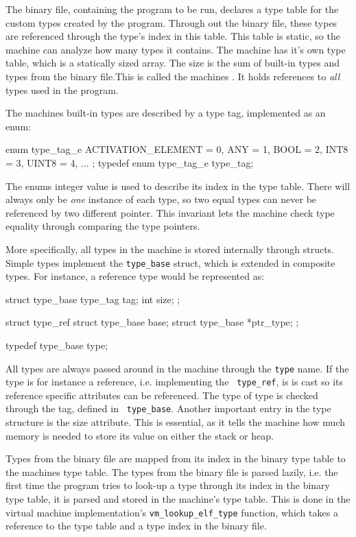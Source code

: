 The binary file, containing the program to be run, declares a type table for the
custom types created by the program. Through out the binary file, these types
are referenced through the type's index in this table. This table is static, so
the machine can analyze how many types it contains. The machine has it's own
type table, which is a statically sized array. The size is the sum of built-in
types and types from the binary file.This is called the machines . It holds references to {\it all} types used in the program.

The machines built-in types are described by a type tag, implemented as an enum:
\begin{ccode}
enum type_tag_e {
    ACTIVATION_ELEMENT = 0,
    ANY                = 1,
    BOOL               = 2,
    INT8               = 3,
    UINT8              = 4,
    ...
};
typedef enum type_tag_e type_tag;
\end{ccode}
The enums integer value is used to describe its index in the type table. There
will always only be {\it one} instance of each type, so two equal types can
never be referenced by two different pointer. This invariant lets the machine
check type equality through comparing the type pointers.

More specifically, all types in the machine is stored internally through
structs. Simple types implement the {\tt type\_base} struct, which is extended
in composite types. For instance, a reference type would be represented as:
\begin{ccode}
struct type_base {
    type_tag tag;
    int size;
};

struct type_ref {
    struct type_base base;
    struct type_base *ptr_type;
};

typedef type_base type;
\end{ccode}

All types are always passed around in the machine through the {\tt type}
name. If the type is for instance a reference, i.e. implementing the {\tt
  type\_ref}, is is cast so its reference specific attributes can be
referenced. The type of type is checked through the tag, defined in {\tt
  type\_base}. Another important entry in the type structure is the size
attribute. This is essential, as it tells the machine how much memory is needed
to store its value on either the stack or heap.

Types from the binary file are mapped from its index in the binary type table to
the machines type table. The types from the binary file is parsed lazily,
i.e. the first time the program tries to look-up a type through its index in the
binary type table, it is parsed and stored in the machine's type table. This is
done in the virtual machine implementation's {\tt vm\_lookup\_elf\_type}
function, which takes a reference to the type table and a type index in the
binary file.

